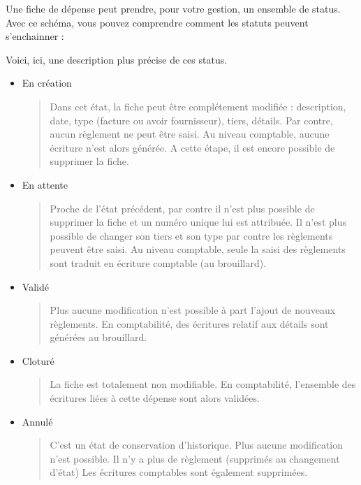 \documentclass[a4paper,10pt,oneside,french]{sphinxmanual}
\begin{document}
\sphinxAtStartPar
Une fiche de dépense peut prendre, pour votre gestion, un ensemble de status.
Avec ce schéma, vous pouvez comprendre comment les statuts peuvent s’enchainner :
\begin{quote}

\noindent{}
\end{quote}

\sphinxAtStartPar
Voici, ici, une description plus précise de ces status.
\begin{itemize}
\item {} 
\sphinxAtStartPar
En création
\begin{quote}

\sphinxAtStartPar
Dans cet état, la fiche peut être complétement modifiée : description, date, type (facture ou avoir fournisseur), tiers, détails.
Par contre, aucun règlement ne peut être saisi.
Au niveau comptable, aucune écriture n’est alors générée.
A cette étape, il est encore possible de supprimer la fiche.
\end{quote}

\item {} 
\sphinxAtStartPar
En attente
\begin{quote}

\sphinxAtStartPar
Proche de l’état précédent, par contre il n’est plus possible de supprimer la fiche et un numéro unique lui est attribuée.
Il n’est plus possible de changer son tiers et son type par contre les règlements peuvent être saisi.
Au niveau comptable, seule la saisi des règlements sont traduit en écriture comptable (au brouillard).
\end{quote}

\item {} 
\sphinxAtStartPar
Validé
\begin{quote}

\sphinxAtStartPar
Plus aucune modification n’est possible à part l’ajout de nouveaux règlements.
En comptabilité, des écritures relatif aux détails sont générées au brouillard.
\end{quote}

\item {} 
\sphinxAtStartPar
Cloturé
\begin{quote}

\sphinxAtStartPar
La fiche est totalement non modifiable.
En comptabilité, l’ensemble des écritures liées à cette dépense sont alors validées.
\end{quote}

\item {} 
\sphinxAtStartPar
Annulé
\begin{quote}

\sphinxAtStartPar
C’est un état de conservation d’historique.
Plus aucune modification n’est possible.
Il n’y a plus de règlement (supprimés au changement d’état)
Les écritures comptables sont également supprimées.
\end{quote}

\end{itemize}
\end{document}
